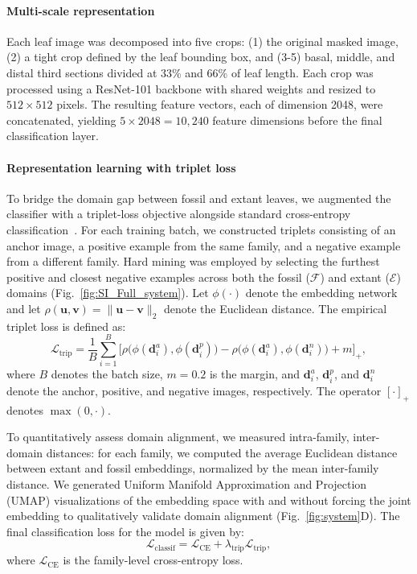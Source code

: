 \documentclass[pdflatex,lineno,sn-nature]{sn-jnl}%
\theoremstyle{plain}%
\theoremstyle{definition}%
\theoremstyle{remark}%
\begin{document}
\paragraph{Multi-scale representation}
Each leaf image was decomposed into five crops: (1) the original masked image, (2) a tight crop defined by the leaf bounding box, and (3-5) basal, middle, and distal third sections divided at 33\% and 66\% of leaf length. Each crop was processed using a ResNet-101 backbone with shared weights and resized to $512 \times 512$ pixels. The resulting feature vectors, each of dimension 2048, were concatenated, yielding $5 \times 2048 = 10,240$ feature dimensions before the final classification layer.

\paragraph{Representation learning with triplet loss}
To bridge the domain gap between fossil and extant leaves, we augmented the classifier with a triplet-loss objective alongside standard cross-entropy classification~\citep{taha2020triplet}. For each training batch, we constructed triplets consisting of an anchor image, a positive example from the same family, and a negative example from a different family. Hard mining was employed by selecting the furthest positive and closest negative examples across both the fossil ($\mathcal{F}$) and extant ($\mathcal{E}$) domains (Fig.~\ref{fig:SI_Full_system}). Let $\phi(\cdot)$ denote the embedding network and let
$\rho(\mathbf{u}, \mathbf{v}) = \lVert \mathbf{u} - \mathbf{v} \rVert_2$
denote the Euclidean distance. The empirical triplet loss is defined as:
\[
\mathcal{L}_{\text{trip}}
=
\frac{1}{B}
\sum_{i=1}^{B}
\Big[
\rho\big(\phi(\mathbf{d}_i^{a}), \phi(\mathbf{d}_i^{p})\big)
-
\rho\big(\phi(\mathbf{d}_i^{a}), \phi(\mathbf{d}_i^{n})\big)
+
m
\Big]_+,
\]
where $B$ denotes the batch size, $m = 0.2$ is the margin, and
$\mathbf{d}_i^{a}$, $\mathbf{d}_i^{p}$, and $\mathbf{d}_i^{n}$ denote the anchor,
positive, and negative images, respectively. The operator $[\cdot]_+$ denotes
$\max(0,\cdot)$.

To quantitatively assess domain alignment, we measured intra-family, inter-domain distances: for each family, we computed the average Euclidean distance between extant and fossil embeddings, normalized by the mean inter-family distance. We generated Uniform Manifold Approximation and Projection (UMAP) visualizations of the embedding space with and without forcing the joint embedding   to qualitatively validate domain alignment (Fig.~\ref{fig:system}D). The final classification loss for the model is given by:
\[
\mathcal{L}_{\text{classif}}=\mathcal{L}_{\text{CE}}+\lambda_{\text{trip}}\mathcal{L}_{\text{trip}},
\]
where $\mathcal{L}_{\text{CE}}$ is the family-level cross-entropy loss.
\end{document}
